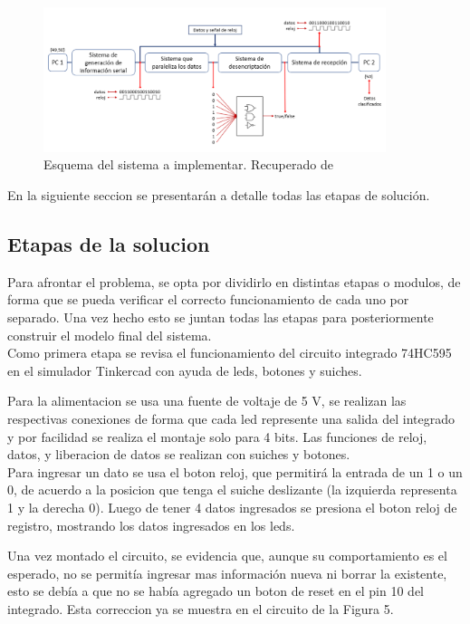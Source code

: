 \documentclass{article}
\begin{document}
\begin{figure}[!ht]
\includegraphics[width=10cm]{esquema.PNG}
\centering
\caption{Esquema del sistema a implementar. Recuperado de \cite{augusto}}
\end{figure}

En la siguiente seccion se presentarán a detalle todas las etapas de solución.

\subsection{Etapas de la solucion}
Para afrontar el problema, se opta por dividirlo en distintas etapas o modulos, de forma que se pueda verificar el correcto funcionamiento de cada uno por separado. Una vez hecho esto se juntan todas las etapas para posteriormente construir el modelo final del sistema.\\

Como primera etapa se revisa el funcionamiento del circuito integrado 74HC595 en el simulador Tinkercad con ayuda de leds, botones y suiches. 

Para la alimentacion se usa una fuente de voltaje de 5 V, se realizan las respectivas conexiones de forma que cada led represente una salida del integrado y por facilidad se realiza el montaje solo para 4 bits. Las funciones de reloj, datos, y liberacion de datos se realizan con suiches y botones.\\

Para ingresar un dato se usa el boton reloj, que permitirá la entrada de un 1 o un 0, de acuerdo a la posicion que tenga el suiche deslizante (la izquierda representa 1 y la derecha 0). Luego de tener 4 datos ingresados se presiona el boton reloj de registro, mostrando los datos ingresados en los leds.

Una vez montado el circuito, se evidencia que, aunque su comportamiento es el esperado, no se permitía ingresar mas información nueva ni borrar la existente, esto se debía a que no se había agregado un boton de reset en el pin 10 del integrado. Esta correccion ya se muestra en el circuito de la Figura 5.
\end{document}
